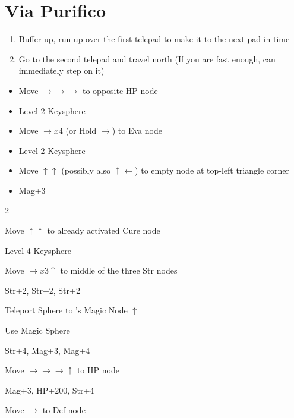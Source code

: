 \chapter{Via Purifico}

\begin{enumerate}
    \item Buffer up, run up over the first telepad to make it to the next pad in time
    \item Go to the second telepad and travel north (If you are fast enough, can immediately step on it)
\end{enumerate}
\begin{spheregrid}
    \begin{itemize}
        \auronf
        \begin{itemize}
            \item Move $\rightarrow\rightarrow\rightarrow$ to opposite HP node
            \item Level 2 Keysphere
            \item Move $\rightarrow x4$ (or Hold $\rightarrow$) to Eva node
            \item Level 2 Keysphere
            \item Move $\uparrow\uparrow$ (possibly also $\uparrow\leftarrow$) to empty node at top-left triangle corner
            \item Mag+3
        \end{itemize}
        \yunaf
        \begin{itemize}
            \begin{multicols}{2}
                \item Move $\uparrow\uparrow$ to already activated Cure node
                \item Level 4 Keysphere
                \item Move $\rightarrow x3 \uparrow$ to middle of the three Str nodes
                \item Str+2, Str+2, Str+2
                \item Teleport Sphere to \auron's Magic Node $\uparrow$
                \item Use Magic Sphere
                \item Str+4, Mag+3, Mag+4
                \item Move $\rightarrow\rightarrow\rightarrow\uparrow$ to HP node
                \item Mag+3, HP+200, Str+4
                \item Move $\rightarrow$ to Def node

\end{multicols}
\end{itemize}
\end{itemize}
\end{spheregrid}
